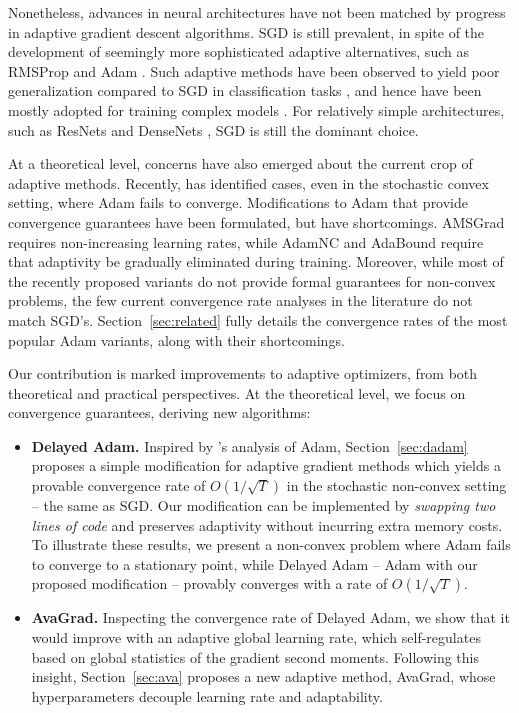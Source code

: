 \documentclass{article}
\begin{document}
Nonetheless, advances in neural architectures have not been matched by progress
in adaptive gradient descent algorithms.  SGD is still prevalent, in
spite of the development of seemingly more sophisticated adaptive alternatives,
such as RMSProp \citep{rmsprop} and Adam \citep{adam}.  Such adaptive methods
have been observed to yield poor generalization compared to SGD in
classification tasks \citep{marginal}, and hence have been mostly adopted for
training complex models \citep{transformers, wgan}.  For relatively simple
architectures, such as ResNets \citep{resnet1} and DenseNets \citep{densenet},
SGD is still the dominant choice.

At a theoretical level, concerns have also emerged about the current crop of
adaptive methods.  Recently, \citet{amsgrad} has identified cases, even in the
stochastic convex setting, where Adam \citep{adam} fails to converge.
Modifications to Adam that provide convergence guarantees have been formulated,
but have shortcomings.  AMSGrad \citep{amsgrad} requires non-increasing
learning rates, while AdamNC \citep{amsgrad} and AdaBound \citep{adabound}
require that adaptivity be gradually eliminated during training.  Moreover,
while most of the recently proposed variants do not provide formal guarantees
for non-convex problems, the few current convergence rate analyses in the literature \citep{yogi,adamlike} do not match SGD's.  Section~\ref{sec:related} fully
details the convergence rates of the most popular Adam variants, along with
their shortcomings.

Our contribution is marked improvements to adaptive optimizers, from both
theoretical and practical perspectives.  At the theoretical level, we focus on
convergence guarantees, deriving new algorithms:

\vspace{-5.0pt}
\begin{itemize}[leftmargin=0.2in]
   \item{
      \textbf{Delayed Adam.} Inspired by \citet{yogi}'s analysis of Adam,
      Section~\ref{sec:dadam} proposes a simple modification for adaptive
      gradient methods which yields a provable convergence rate of
      $O(1 / \sqrt T)$ in the stochastic non-convex setting -- the same as SGD.
      Our modification can be implemented by \emph{swapping two lines of code}
      and preserves adaptivity without incurring extra memory costs.  To
      illustrate these results, we present a non-convex problem where Adam
      fails to converge to a stationary point, while Delayed Adam -- Adam with
      our proposed modification -- provably converges with a rate of
      $O(1 / \sqrt T)$.
   }
   \item{
      \textbf{AvaGrad.}
      Inspecting the convergence rate of Delayed Adam, we show that it would
      improve with an adaptive global learning rate, which self-regulates based
      on global statistics of the gradient second moments.  Following this
      insight, Section~\ref{sec:ava} proposes a new adaptive method, AvaGrad,
      whose hyperparameters decouple learning rate and adaptability.
   }
\end{itemize}
\end{document}
